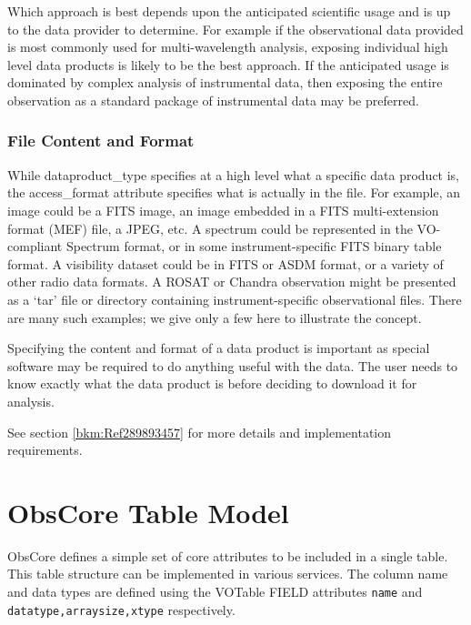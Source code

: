 \documentclass[11pt,a4paper]{ivoa}
\begin{document}
Which approach is best depends upon the anticipated scientific usage and is up to the data provider to determine.  For
example if the observational data provided is most commonly used for multi-wavelength analysis, exposing individual
high level data products is likely to be the best approach.  If the anticipated usage is dominated by complex analysis
of instrumental data, then exposing the entire observation as a standard package of instrumental data may be preferred.

\subsubsection{File Content and Format}
While dataproduct\_type specifies at a high level what a specific data product is, the access\_format attribute
specifies what is actually in the file.  For example, an {\textquotedbl}image{\textquotedbl} could be a FITS image, an
image embedded in a FITS multi-extension format (MEF) file, a JPEG, etc.  A {\textquotedbl}spectrum{\textquotedbl}
could be represented in the VO-compliant Spectrum format, or in some instrument-specific FITS binary table format.  A
visibility dataset could be in FITS or ASDM format, or a variety of other radio data formats.  A ROSAT or Chandra
observation might be presented as a `tar' file or directory containing instrument-specific observational files.  There
are many such examples; we give only a few here to illustrate the concept.

Specifying the content and format of a data product is important as special software may be required to do anything
useful with the data.  The user needs to know exactly what the data product is before deciding to download it for
analysis.

See section \ref{bkm:Ref289893457} for more details and implementation requirements.
\fi %

\section{ObsCore Table Model}

ObsCore defines a simple set of core attributes to be included in a single table. This table structure can be
implemented in various services. The column name and data types are defined using the VOTable FIELD attributes
\verb|name| and \verb|datatype,arraysize,xtype| respectively.
\end{document}
